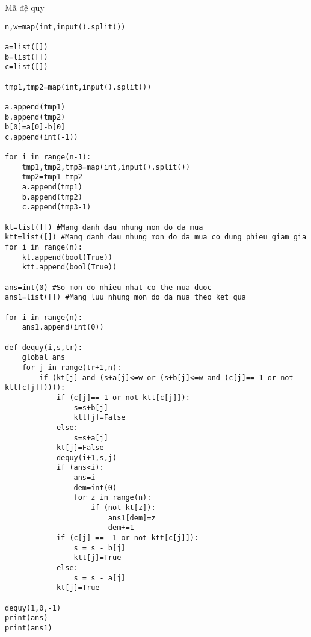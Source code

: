 \documentclass[10pt,a4paper]{article}
\begin{document}
\vspace{2 cm}
Mã đệ quy\\
\begin{lstlisting}
n,w=map(int,input().split())

a=list([])
b=list([])
c=list([])

tmp1,tmp2=map(int,input().split())

a.append(tmp1)
b.append(tmp2)
b[0]=a[0]-b[0]
c.append(int(-1))

for i in range(n-1):
    tmp1,tmp2,tmp3=map(int,input().split())
    tmp2=tmp1-tmp2
    a.append(tmp1)
    b.append(tmp2)
    c.append(tmp3-1)

kt=list([]) #Mang danh dau nhung mon do da mua
ktt=list([]) #Mang danh dau nhung mon do da mua co dung phieu giam gia
for i in range(n):
    kt.append(bool(True))
    ktt.append(bool(True))

ans=int(0) #So mon do nhieu nhat co the mua duoc
ans1=list([]) #Mang luu nhung mon do da mua theo ket qua

for i in range(n):
    ans1.append(int(0))

def dequy(i,s,tr):
    global ans
    for j in range(tr+1,n):
        if (kt[j] and (s+a[j]<=w or (s+b[j]<=w and (c[j]==-1 or not ktt[c[j]])))):
            if (c[j]==-1 or not ktt[c[j]]):
                s=s+b[j]
                ktt[j]=False
            else:
                s=s+a[j]
            kt[j]=False
            dequy(i+1,s,j)
            if (ans<i):
                ans=i
                dem=int(0)
                for z in range(n):
                    if (not kt[z]):
                        ans1[dem]=z
                        dem+=1
            if (c[j] == -1 or not ktt[c[j]]):
                s = s - b[j]
                ktt[j]=True
            else:
                s = s - a[j]
            kt[j]=True

dequy(1,0,-1)
print(ans)
print(ans1)
\end{lstlisting}
\end{document}
